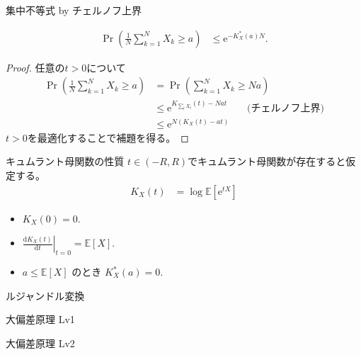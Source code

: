 \documentclass[lualatex,handout]{beamer}
\newcommand{\expt}[1]{\mathbb{E}\left[#1\right]}
\theoremstyle{definition}
\begin{document}
\begin{frame}{集中不等式 by チェルノフ上界}
\begin{lemma}
\begin{align*}
\Pr\left(\frac1N\sum_{k=1}^N X_k\ge a\right) &\le \mathrm{e}^{-K_X^*(a)N}.
\end{align*}
\end{lemma}
\begin{proof}
\small
任意の$t>0$について
\begin{align*}
\Pr\left(\frac1N\sum_{k=1}^N X_k\ge a\right) &=
\Pr\left(\sum_{k=1}^N X_k\ge Na\right)\\
&\le\mathrm{e}^{K_{\sum_t X_t}(t) - Nat}\qquad\text{(チェルノフ上界)}\\
&\le\mathrm{e}^{N(K_X(t) - at)}
\end{align*}
$t>0$を最適化することで補題を得る。
\end{proof}
\end{frame}

\begin{frame}{キュムラント母関数の性質}
$t\in(-R, R)$でキュムラント母関数が存在すると仮定する。
\begin{align*}
K_X(t) &= \log \expt{\mathrm{e}^{tX}}
\end{align*}
\begin{itemize}
\setlength{\itemsep}{2em}
\item $K_X(0) = 0$.
\item $\left.\frac{\mathrm{d}K_X(t)}{\mathrm{d} t}\right|_{t=0} = \expt{X}$.
\item $a \le \expt{X}$ のとき $K_X^*(a) = 0$.
\end{itemize}
\end{frame}

\begin{frame}{ルジャンドル変換}
\centering
{}
\end{frame}

\begin{frame}{大偏差原理 Lv1}
\begin{theorem}[クラメールの定理]
\end{theorem}
\end{frame}

\begin{frame}{大偏差原理 Lv2}
\begin{theorem}[サノフの定理]
\end{theorem}
\end{frame}
\end{document}
